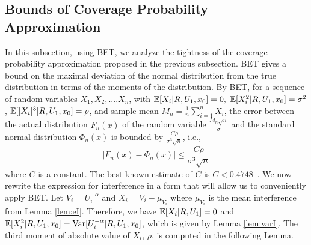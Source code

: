 \documentclass[journal,draftclsnofoot,onecolumn,12pt]{IEEEtran}
\begin{document}
\subsection{Bounds of Coverage Probability Approximation}
In this subsection, using BET, we analyze the tightness of the coverage probability approximation proposed in the previous subsection. BET gives a bound on the maximal deviation of the normal distribution from the true distribution in terms of the moments of the distribution. By BET, for a sequence of random variables $X_1, X_2,....X_n$, with ${\mathbb{E}}[X_i | R, U_1, x_0] = 0,\  {\mathbb{E}}[X_i^2 |R, U_1, x_0]= \sigma^2$,  ${\mathbb{E}}[ |X_i|^3 | R, U_1, x_0] = \rho$, and sample mean $M_n = \frac{1}{n}\sum_{i=1}^n X_i$, the error between the actual distribution $F_n(x)$ of the random variable $\frac{M_n\sqrt{n}}{\sigma}$ and the standard normal distribution $\Phi_n(x)$ is bounded by $\frac{C \rho}{\sigma^3 \sqrt{n}}$, i.e.,
\begin{equation}
|F_n(x) - \Phi_n(x)| \leq \frac{C \rho}{\sigma^3 \sqrt{n}}
\end{equation}
where $C$ is a constant. The best known estimate of $C$ is $C<0.4748$~\cite{shevtsova}. We now rewrite the expression for interference in a form that will allow us to conveniently apply BET. Let $V_i = U_i^{-\alpha}$ and $X_i = V_i - \mu_{V_i}$ where $\mu_{V_i}$ is the mean interference from Lemma \ref{lem:eI}. Therefore, we have ${\mathbb{E}}[X_i | R, U_1]=0$ and ${\mathbb{E}}[X_i^2 | R, U_1, x_0] = \operatorname{Var}[U_i^{-\alpha}|R, U_1, x_0]$, which is given by Lemma \ref{lem:varI}. The third moment of absolute value of $X_i$, $\rho$, is computed in the following Lemma.
%
\end{document}
